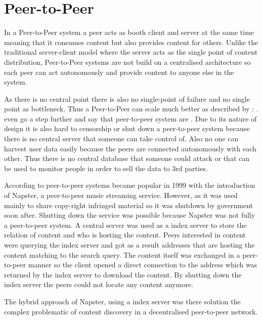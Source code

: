 \section{Peer-to-Peer}
In a Peer-to-Peer system a peer acts as booth client and server at the same time meaning that it consumes content but also provides content for others. Unlike the traditional server-client model where the server acts as the single point of content distribution, Peer-to-Peer systems are not build on a centralised architecture so each peer can act autonomously and provide content to anyone else in the system.

As there is no central point there is also no single-point of failure and no single point as bottleneck. Thus a Peer-to-Peer can scale much better as described by \citet[\S1]{newscast-gossiping}:
. \citet[\S7.5.4]{tanenbaum_wetherall_2011} even go a step further and say that peer-to-peer system are .
Due to its nature of design it is also hard to censorship or shut down a peer-to-peer system because there is no central server that someone can take control of. Also no one can harvest user data easily because the peers are connected autonomously with each other. Thus there is no central database that someone could attack or that can be used to monitor people in order to sell the data to 3rd parties.

According to \citet{tanenbaum_wetherall_2011} peer-to-peer systems became popular in 1999 with the introduction of Napster, a peer-to-peer music streaming service. However, as it was used mainly to share copy-right infringed material so it was shutdown by government soon after.  Shutting down the service was possible because Napster was not fully a peer-to-peer system. A central server was used as a index server to store the relation of content and who is hosting the content. Peers interested in content were querying the index server and got as a result addresses that are hosting the content matching to the search query. The content itself was exchanged in a peer-to-peer manner so the client opened a direct connection to the address which was returned by the index server to download the content. By shutting down the index server the peers could not locate any content anymore. 

The hybrid approach of Napster, using a index server was there solution the complex problematic of content discovery in a decentralised peer-to-peer network.

